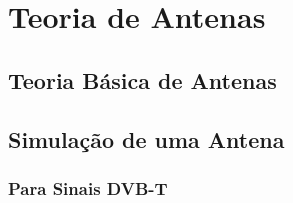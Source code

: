 
\chapter{Teoria de Antenas} %
\label{chap:Chapter3} %

\section{Teoria Básica de Antenas}



\section{Simulação de uma Antena}


\subsection{Para Sinais DVB-T}

